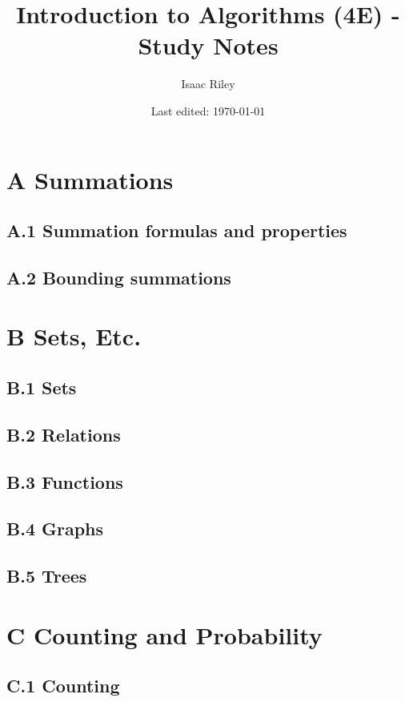 \documentclass[a4paper]{article}
\title{Introduction to Algorithms (4E) - Study Notes}
\author{Isaac Riley}
\date{Last edited: \today}
\begin{document}
\maketitle
\tableofcontents
\newpage




\section*{A Summations}
\subsection*{A.1 Summation formulas and properties}
\subsection*{A.2 Bounding summations}

\newpage
\section*{B Sets, Etc.}
\subsection*{B.1 Sets}
\subsection*{B.2 Relations}
\subsection*{B.3 Functions}
\subsection*{B.4 Graphs}
\subsection*{B.5 Trees}

\newpage
\section*{C Counting and Probability}
\subsection*{C.1 Counting}
\end{document}
